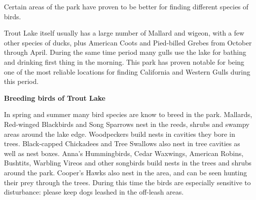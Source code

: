 Certain areas of the park have proven to be better for finding different species of birds. 

Trout Lake itself usually has a large number of Mallard and wigeon, with a few other species of ducks, plus American Coots and Pied-billed Grebes from October through April. During the same time period many gulls use the lake for bathing and drinking first thing in the morning. This park has proven notable for being one of the most reliable locations for finding California and Western Gulls during this period. 

\textbf{Breeding birds of Trout Lake}

In spring and summer many bird species are know to breed in the park. 
Mallards, Red-winged Blackbirds and Song Sparrows nest in the reeds, shrubs 
and swampy areas around the lake edge. Woodpeckers build nests in cavities they 
bore in trees. Black-capped Chickadees and Tree Swallows also nest in tree cavities 
as well as nest boxes.
Anna's Hummingbirds, Cedar Waxwings, American Robins, Bushtits, Warbling Vireos and 
other songbirds build nests in the trees and shrubs around the park. 
Cooper's Hawks also nest in the 
area, and can be seen hunting their prey through the trees. During this time the 
birds are especially sensitive to disturbance: please keep dogs leashed in the off-leash areas.

